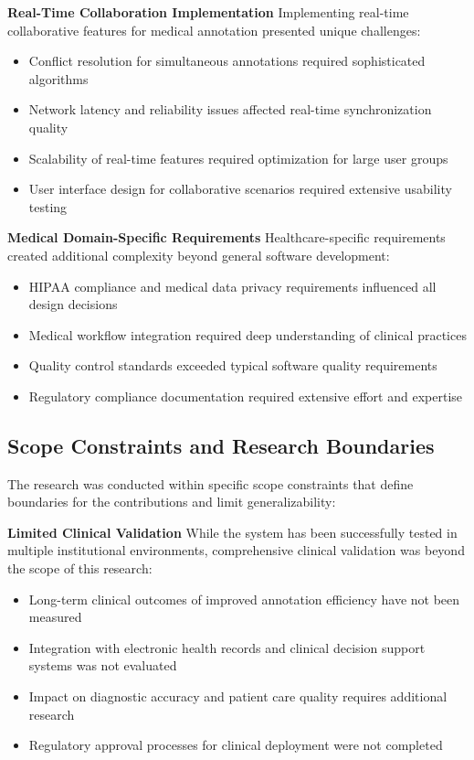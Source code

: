 \textbf{Real-Time Collaboration Implementation}
Implementing real-time collaborative features for medical annotation presented unique challenges:

\begin{itemize}
    \item Conflict resolution for simultaneous annotations required sophisticated algorithms
    \item Network latency and reliability issues affected real-time synchronization quality
    \item Scalability of real-time features required optimization for large user groups
    \item User interface design for collaborative scenarios required extensive usability testing
\end{itemize}

\textbf{Medical Domain-Specific Requirements}
Healthcare-specific requirements created additional complexity beyond general software development:

\begin{itemize}
    \item HIPAA compliance and medical data privacy requirements influenced all design decisions
    \item Medical workflow integration required deep understanding of clinical practices
    \item Quality control standards exceeded typical software quality requirements
    \item Regulatory compliance documentation required extensive effort and expertise
\end{itemize}

\subsection{Scope Constraints and Research Boundaries}

The research was conducted within specific scope constraints that define boundaries for the contributions and limit generalizability:

\textbf{Limited Clinical Validation}
While the system has been successfully tested in multiple institutional environments, comprehensive clinical validation was beyond the scope of this research:

\begin{itemize}
    \item Long-term clinical outcomes of improved annotation efficiency have not been measured
    \item Integration with electronic health records and clinical decision support systems was not evaluated
    \item Impact on diagnostic accuracy and patient care quality requires additional research
    \item Regulatory approval processes for clinical deployment were not completed
\end{itemize}

